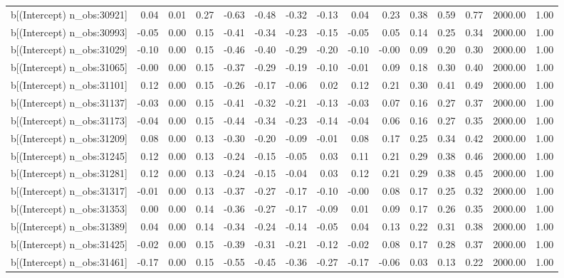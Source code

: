 \begin{table}[ht]
\begin{tabular}{rrrrrrrrrrrrrrr}
  b[(Intercept) n\_obs:30921] & 0.04 & 0.01 & 0.27 & -0.63 & -0.48 & -0.32 & -0.13 & 0.04 & 0.23 & 0.38 & 0.59 & 0.77 & 2000.00 & 1.00 \\ 
  b[(Intercept) n\_obs:30993] & -0.05 & 0.00 & 0.15 & -0.41 & -0.34 & -0.23 & -0.15 & -0.05 & 0.05 & 0.14 & 0.25 & 0.34 & 2000.00 & 1.00 \\ 
  b[(Intercept) n\_obs:31029] & -0.10 & 0.00 & 0.15 & -0.46 & -0.40 & -0.29 & -0.20 & -0.10 & -0.00 & 0.09 & 0.20 & 0.30 & 2000.00 & 1.00 \\ 
  b[(Intercept) n\_obs:31065] & -0.00 & 0.00 & 0.15 & -0.37 & -0.29 & -0.19 & -0.10 & -0.01 & 0.09 & 0.18 & 0.30 & 0.40 & 2000.00 & 1.00 \\ 
  b[(Intercept) n\_obs:31101] & 0.12 & 0.00 & 0.15 & -0.26 & -0.17 & -0.06 & 0.02 & 0.12 & 0.21 & 0.30 & 0.41 & 0.49 & 2000.00 & 1.00 \\ 
  b[(Intercept) n\_obs:31137] & -0.03 & 0.00 & 0.15 & -0.41 & -0.32 & -0.21 & -0.13 & -0.03 & 0.07 & 0.16 & 0.27 & 0.37 & 2000.00 & 1.00 \\ 
  b[(Intercept) n\_obs:31173] & -0.04 & 0.00 & 0.15 & -0.44 & -0.34 & -0.23 & -0.14 & -0.04 & 0.06 & 0.16 & 0.27 & 0.35 & 2000.00 & 1.00 \\ 
  b[(Intercept) n\_obs:31209] & 0.08 & 0.00 & 0.13 & -0.30 & -0.20 & -0.09 & -0.01 & 0.08 & 0.17 & 0.25 & 0.34 & 0.42 & 2000.00 & 1.00 \\ 
  b[(Intercept) n\_obs:31245] & 0.12 & 0.00 & 0.13 & -0.24 & -0.15 & -0.05 & 0.03 & 0.11 & 0.21 & 0.29 & 0.38 & 0.46 & 2000.00 & 1.00 \\ 
  b[(Intercept) n\_obs:31281] & 0.12 & 0.00 & 0.13 & -0.24 & -0.15 & -0.04 & 0.03 & 0.12 & 0.21 & 0.29 & 0.38 & 0.45 & 2000.00 & 1.00 \\ 
  b[(Intercept) n\_obs:31317] & -0.01 & 0.00 & 0.13 & -0.37 & -0.27 & -0.17 & -0.10 & -0.00 & 0.08 & 0.17 & 0.25 & 0.32 & 2000.00 & 1.00 \\ 
  b[(Intercept) n\_obs:31353] & 0.00 & 0.00 & 0.14 & -0.36 & -0.27 & -0.17 & -0.09 & 0.01 & 0.09 & 0.17 & 0.26 & 0.35 & 2000.00 & 1.00 \\ 
  b[(Intercept) n\_obs:31389] & 0.04 & 0.00 & 0.14 & -0.34 & -0.24 & -0.14 & -0.05 & 0.04 & 0.13 & 0.22 & 0.31 & 0.38 & 2000.00 & 1.00 \\ 
  b[(Intercept) n\_obs:31425] & -0.02 & 0.00 & 0.15 & -0.39 & -0.31 & -0.21 & -0.12 & -0.02 & 0.08 & 0.17 & 0.28 & 0.37 & 2000.00 & 1.00 \\ 
  b[(Intercept) n\_obs:31461] & -0.17 & 0.00 & 0.15 & -0.55 & -0.45 & -0.36 & -0.27 & -0.17 & -0.06 & 0.03 & 0.13 & 0.22 & 2000.00 & 1.00 \\ 

\end{tabular}
\end{table}
